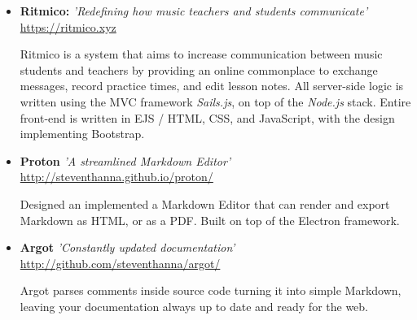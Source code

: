 \documentclass[11pt,a4paper,roman]{moderncv}        %
\begin{document}
\vspace{2pt}

\begin{itemize}

\item{\textbf{Ritmico:} \textit{'Redefining how music teachers and students communicate'} \url{https://ritmico.xyz}

\vspace{2pt}

\small{Ritmico is a system that aims to increase communication between music students and teachers by providing an online commonplace to exchange messages, record practice times, and edit lesson notes.  All server-side logic is written using the MVC framework \textit{Sails.js}, on top of the \textit{Node.js} stack.  Entire front-end is written in EJS / HTML, CSS, and JavaScript, with the design implementing Bootstrap.}}

\vspace{2pt}

\item{\textbf{Proton} \textit{'A streamlined Markdown Editor'}  \url{http://steventhanna.github.io/proton/}

\vspace{3pt}

\small{Designed an implemented a Markdown Editor that can render and export Markdown as HTML, or as a PDF. Built on top of the Electron framework.}}

\vspace{4pt}

\item{\textbf{Argot} \textit{'Constantly updated documentation'}  \url{http://github.com/steventhanna/argot/}

\vspace{3pt}

\small{Argot parses comments inside source code turning it into simple Markdown, leaving your documentation always up to date and ready for the web.}}

\vspace{4pt}

\end{itemize}

\nocite{*}



\end{document}
